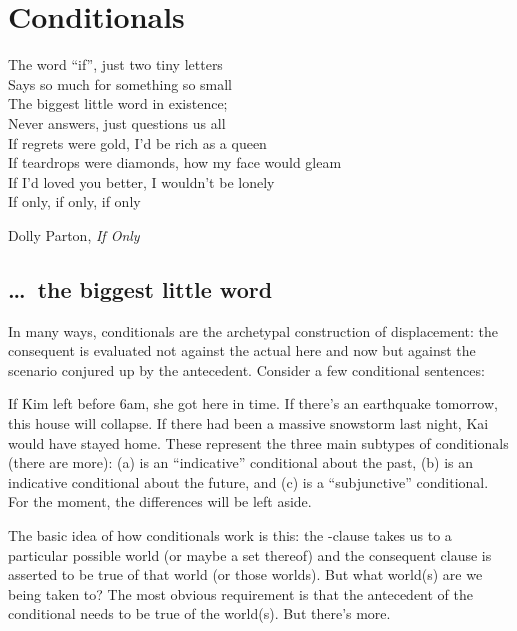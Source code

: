 \chapter{Conditionals}\label{cha:conditionals} %

{\setlength{\epigraphwidth}{44ex}\epigraph{The word ``if'', just two tiny letters \\
    Says so much for something so small \\
    The biggest little word in existence; \\
    Never answers, just questions us all\\[6pt]

    If regrets were gold, I'd be rich as a queen \\
    If teardrops were diamonds, how my face would gleam \\
    If I'd loved you better, I wouldn't be lonely \\
    If only, if only, if only}{Dolly Parton, \emph{If Only}}}


\minitoc

\section{ \dots\ the biggest little word}
\label{sec:if}

In many ways, conditionals are the archetypal construction of displacement: the
consequent is evaluated not against the actual here and now but against the
scenario conjured up by the antecedent. Consider a few conditional sentences:

\pex
\a If Kim left before 6am, she got here in time.
\a If there's an earthquake tomorrow, this house will collapse.\label{ex:earthquake}
\a If there had been a massive snowstorm last night, Kai would have stayed home.
\xe
%
These represent the three main subtypes of conditionals (there are more):
(\lastx a) is an ``indicative'' conditional about the past, (\lastx b) is an
indicative conditional about the future, and (\lastx c) is a ``subjunctive''
conditional. For the moment, the differences will be left aside.

The basic idea of how conditionals work is this: the -clause
takes us to a particular possible world (or maybe a set thereof) and the
consequent clause is asserted to be true of that world (or those worlds). But
what world(s) are we being taken to? The most obvious requirement is that the
antecedent of the conditional needs to be true of the world(s). But there's
more.


